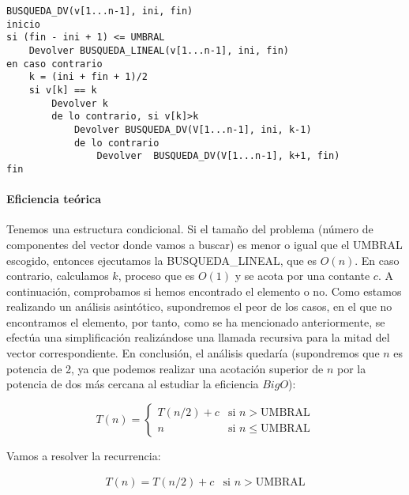 \begin{lstlisting}
BUSQUEDA_DV(v[1...n-1], ini, fin)
inicio
si (fin - ini + 1) <= UMBRAL 
    Devolver BUSQUEDA_LINEAL(v[1...n-1], ini, fin)
en caso contrario
    k = (ini + fin + 1)/2
    si v[k] == k
        Devolver k
        de lo contrario, si v[k]>k
            Devolver BUSQUEDA_DV(V[1...n-1], ini, k-1)
            de lo contrario
                Devolver  BUSQUEDA_DV(V[1...n-1], k+1, fin)
fin
\end{lstlisting}

 

\paragraph{Eficiencia teórica}

Tenemos una estructura condicional. Si el tamaño del problema (número de componentes del vector donde 
vamos a buscar) es menor o igual que el UMBRAL escogido, entonces ejecutamos la BUSQUEDA\_LINEAL, que es $O(n)$. 
En caso contrario, calculamos $k$, proceso que es $O(1)$ y se acota por una contante $c$. A continuación,
comprobamos si hemos encontrado el elemento o no. Como estamos realizando un análisis asintótico, supondremos
el peor de los casos, en el que no encontramos el elemento, por tanto, como se ha mencionado anteriormente,
se efectúa una simplificación realizándose una llamada recursiva para la mitad del vector correspondiente.
En conclusión, el análisis quedaría (supondremos que $n$ es potencia de 2, ya que podemos realizar una acotación 
superior de $n$ por la potencia de dos más cercana al estudiar la eficiencia $Big O$): 

\begin{equation}
    T(n) = \left\{ \begin{array}{lr} T(n/2) + c & \text{si } n > \text{UMBRAL}\\ n & \text{si } n \leqslant \text{UMBRAL} \end{array} \right.
\end{equation}

Vamos a resolver la recurrencia:

\begin{equation*}
    \begin{array}{lr}  T(n) =  T(n/2) + c & \text{si } n > \text{UMBRAL} \end{array}
\end{equation*}

